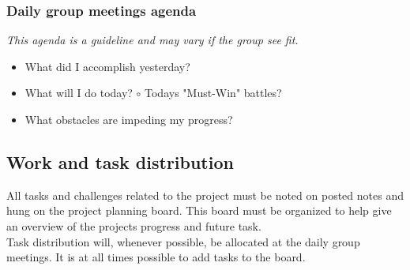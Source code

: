 \subsubsection{Daily group meetings agenda}
\textit{This agenda is a guideline and may vary if the group see fit.}
\begin{itemize}
\item What did I accomplish yesterday?
\item What will I do today?
\subitem $\circ$ Todays "Must-Win" battles?
\item What obstacles are impeding my progress?
\end{itemize}

\subsection{Work and task distribution}
All tasks and challenges related to the project must be noted on posted notes and hung on the project planning board. This board must be organized to help give an overview of the projects progress and future task.\\
Task distribution will, whenever possible, be allocated at the daily group meetings. It is at all times possible to add tasks to the board.\\

